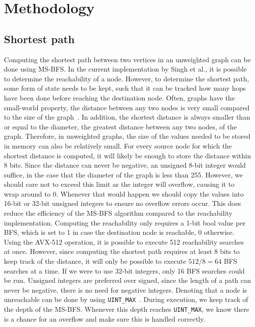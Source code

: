\section{Methodology}\label{sec:method}
\subsection{Shortest path}
Computing the shortest path between two vertices in an unweighted graph can be done using MS-BFS. 
In the current implementation by Singh et al., it is possible to determine the reachability of a node. 
However, to determine the shortest path, some form of state needs to be kept, such that it can be tracked how many hops have been done before reaching the destination node. 
Often, graphs have the small-world property, the distance between any two nodes is very small compared to the size of the graph~\cite{10.14778/2735496.2735507}. 
In addition, the shortest distance is always smaller than or equal to the diameter, the greatest distance between any two nodes, of the graph.
Therefore, in unweighted graphs, the size of the values needed to be stored in memory can also be relatively small. 
For every source node for which the shortest distance is computed, it will likely be enough to store the distance within 8 bits. 
Since the distance can never be negative, an unsigned 8-bit integer would suffice, in the case that the diameter of the graph is less than 255. 
However, we should care not to exceed this limit as the integer will overflow, causing it to wrap around to 0. 
Whenever that would happen we should copy the values into 16-bit or 32-bit unsigned integers to ensure no overflow errors occur.
This does reduce the efficiency of the MS-BFS algorithm compared to the reachability implementation. 
Computing the reachability only requires a 1-bit bool value per BFS, which is set to 1 in case the destination node is reachable, 0 otherwise. 
Using the AVX-512 operation, it is possible to execute 512 reachability searches at once. 
However, since computing the shortest path requires at least 8 bits to keep track of the distance, it will only be possible to execute $512/8 = 64$ BFS searches at a time. 
If we were to use 32-bit integers, only 16 BFS searches could be run.
Unsigned integers are preferred over signed, since the length of a path can never be negative, there is no need for negative integers. Denoting that a node is unreachable can be done by using \texttt{UINT\_MAX}~\cite{uint-max}. During execution, we keep track of the depth of the MS-BFS. Whenever this depth reaches \texttt{UINT\_MAX}, we know there is a chance for an overflow and make sure this is handled correctly.

